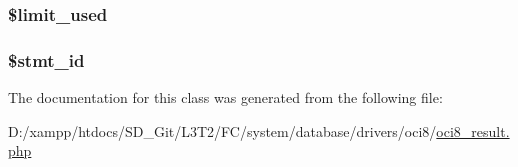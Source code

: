 \subsubsection[{\$limit\+\_\+used}]{\setlength{\rightskip}{0pt plus 5cm}\$limit\+\_\+used}\label{class_c_i___d_b__oci8__result_a96df35d7e3e76bef21ebb80234fe59e8}
\hypertarget{class_c_i___d_b__oci8__result_a1a97f17fd259cd27c73b65e6c3706ec0}{}
\subsubsection[{\$stmt\+\_\+id}]{\setlength{\rightskip}{0pt plus 5cm}\$stmt\+\_\+id}\label{class_c_i___d_b__oci8__result_a1a97f17fd259cd27c73b65e6c3706ec0}


The documentation for this class was generated from the following file\+:\begin{DoxyCompactItemize}
\item 
D\+:/xampp/htdocs/\+S\+D\+\_\+\+Git/\+L3\+T2/\+F\+C/system/database/drivers/oci8/\hyperlink{oci8__result_8php}{oci8\+\_\+result.\+php}\end{DoxyCompactItemize}

